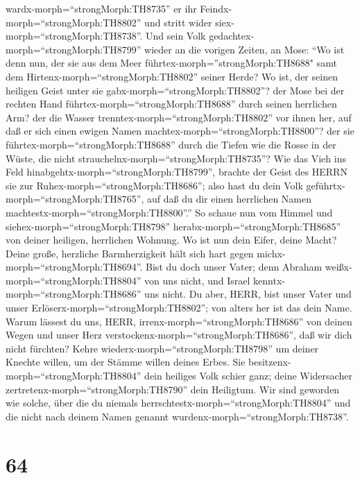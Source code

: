 wardx-morph=``strongMorph:TH8735'' er ihr
Feindx-morph=``strongMorph:TH8802'' und stritt wider
siex-morph=``strongMorph:TH8738''.  Und sein Volk
gedachtex-morph=``strongMorph:TH8799'' wieder an die vorigen Zeiten, an
Mose: ``Wo ist denn nun, der sie aus dem Meer
führtex-morph=''strongMorph:TH8688" samt dem
Hirtenx-morph=``strongMorph:TH8802'' seiner Herde? Wo ist, der seinen
heiligen Geist unter sie gabx-morph=``strongMorph:TH8802''?
 der Mose bei der rechten Hand
führtex-morph=``strongMorph:TH8688'' durch seinen herrlichen Arm? der
die Wasser trenntex-morph=``strongMorph:TH8802'' vor ihnen her, auf daß
er sich einen ewigen Namen machtex-morph=``strongMorph:TH8800''?
 der sie führtex-morph=``strongMorph:TH8688'' durch die
Tiefen wie die Rosse in der Wüste, die nicht
strauchelnx-morph=``strongMorph:TH8735''?  Wie das Vieh ins
Feld hinabgehtx-morph=``strongMorph:TH8799'', brachte der Geist des
HERRN sie zur Ruhex-morph=``strongMorph:TH8686''; also hast du dein Volk
geführtx-morph=``strongMorph:TH8765'', auf daß du dir einen herrlichen
Namen machtestx-morph=``strongMorph:TH8800''.''  So schaue
nun vom Himmel und siehex-morph=``strongMorph:TH8798''
herabx-morph=``strongMorph:TH8685'' von deiner heiligen, herrlichen
Wohnung. Wo ist nun dein Eifer, deine Macht? Deine große, herzliche
Barmherzigkeit hält sich hart gegen michx-morph=``strongMorph:TH8694''.
 Bist du doch unser Vater; denn Abraham
weißx-morph=``strongMorph:TH8804'' von uns nicht, und Israel
kenntx-morph=``strongMorph:TH8686'' uns nicht. Du aber, HERR, bist unser
Vater und unser Erlöserx-morph=``strongMorph:TH8802''; von alters her
ist das dein Name.  Warum lässest du uns, HERR,
irrenx-morph=``strongMorph:TH8686'' von deinen Wegen und unser Herz
verstockenx-morph=``strongMorph:TH8686'', daß wir dich nicht fürchten?
Kehre wiederx-morph=``strongMorph:TH8798'' um deiner Knechte willen, um
der Stämme willen deines Erbes.  Sie
besitzenx-morph=``strongMorph:TH8804'' dein heiliges Volk schier ganz;
deine Widersacher zertretenx-morph=``strongMorph:TH8790'' dein
Heiligtum.  Wir sind geworden wie solche, über die du
niemals herrschtestx-morph=``strongMorph:TH8804'' und die nicht nach
deinem Namen genannt wurdenx-morph=``strongMorph:TH8738''.

\hypertarget{section-63}{%
\section{64}\label{section-63}}

